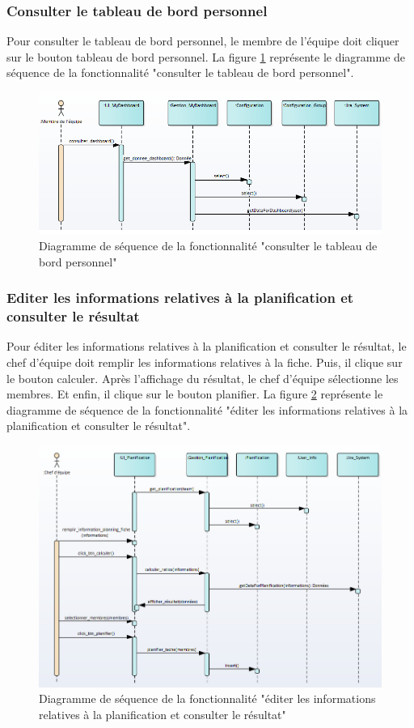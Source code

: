 \subsubsection{Consulter le tableau de bord personnel}
Pour consulter le tableau de bord personnel, le membre de l'équipe doit cliquer sur le bouton tableau de bord personnel.
La figure \ref{code81} représente le diagramme de séquence de la fonctionnalité "consulter le tableau de bord personnel".
\begin{figure}[H]
  \centering
 \includegraphics[scale=0.69]{figures/diagrams/sequence/mydashboard_seq_diag.png}
 \caption{Diagramme de séquence de la fonctionnalité "consulter le tableau de bord personnel"}
 \label{code81}
\end{figure}

\subsubsection{Editer les informations relatives à la planification et consulter le résultat}
Pour éditer les informations relatives à la planification et consulter le résultat, le chef d'équipe doit remplir les informations relatives à la fiche. Puis, il clique sur le bouton calculer. Après l'affichage du résultat, le chef d'équipe sélectionne les membres. Et enfin, il clique sur le bouton planifier.
La figure \ref{code82} représente le diagramme de séquence de la fonctionnalité "éditer les informations relatives à la planification et consulter le résultat".
\begin{figure}[H]
  \centering
 \includegraphics[scale=0.69]{figures/diagrams/sequence/planification_seq_diag.png}
 \caption{Diagramme de séquence de la fonctionnalité "éditer les informations relatives à la planification et consulter le résultat"}
 \label{code82}
\end{figure}

